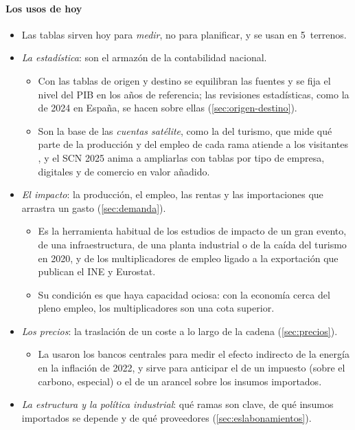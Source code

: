 \documentclass[11pt]{article}
\begin{document}
\paragraph{Los usos de hoy}

\begin{itemize}
\item Las tablas sirven hoy para \emph{medir}, no para planificar, y se usan en 5~terrenos.
\item \emph{La estadística}: son el armazón de la contabilidad nacional.
  \begin{itemize}
  \item Con las tablas de origen y destino se equilibran las fuentes y se fija el nivel del PIB en los años de referencia; las revisiones estadísticas, como la de 2024 en España, se hacen sobre ellas (\ref{sec:origen-destino})\nocite{INE2025TIO2022}.
  \item Son la base de las \emph{cuentas satélite}, como la del turismo, que mide qué parte de la producción y del empleo de cada rama atiende a los visitantes , y el SCN 2025 anima a ampliarlas con tablas por tipo de empresa, digitales y de comercio en valor añadido.
  \end{itemize}
\item \emph{El impacto}: la producción, el empleo, las rentas y las importaciones que arrastra un gasto (\ref{sec:demanda}).
  \begin{itemize}
  \item Es la herramienta habitual de los estudios de impacto de un gran evento, de una infraestructura, de una planta industrial o de la caída del turismo en 2020, y de los multiplicadores de empleo ligado a la exportación que publican el INE y Eurostat\nocite{INE2026TiVA2024}.
  \item Su condición es que haya capacidad ociosa: con la economía cerca del pleno empleo, los multiplicadores son una cota superior.
  \end{itemize}
\item \emph{Los precios}: la traslación de un coste a lo largo de la cadena (\ref{sec:precios}).
  \begin{itemize}
  \item La usaron los bancos centrales para medir el efecto indirecto de la energía en la inflación de 2022\nocite{IbanezdeAldecoa2023,ArceEtAl2024What}, y sirve para anticipar el de un impuesto (sobre el carbono, especial) o el de un arancel sobre los insumos importados.
  \end{itemize}
\item \emph{La estructura y la política industrial}: qué ramas son clave, de qué insumos importados se depende y de qué proveedores (\ref{sec:eslabonamientos}).

\end{itemize}
\end{document}
